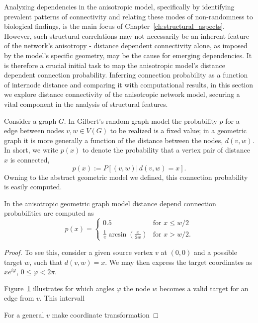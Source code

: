 Analyzing dependencies in the anisotropic model, specifically by
identifying prevalent patterns of connectivity and relating these
modes of non-randomness to biological findings, is the main focus of
Chapter~\ref{ch:structural_aspects}. However, such structural
correlations may not necessarily be an inherent feature of the
network's anisotropy - distance dependent connectivity alone, as
imposed by the model's specific geometry, may be the cause for
emerging dependencies. It is therefore a crucial initial task to map
the anisotropic model's distance dependent connection
probability. Inferring connection probability as a function of
internode distance and comparing it with computational results, in
this section we explore distance connectivity of the anisotropic
network model, securing a vital component in the analysis of
structural features.

Consider a graph $G$. In Gilbert's random graph model the probability
$p$ for a edge between nodes $v,w \in V(G)$ to be realized is a fixed
value; in a geometric graph it is more generally a function of the
distance between the nodes, $d(v,w)$. In short, we write $p(x)$ to
denote the probability that a vertex pair of distance $x$ is
connected,
\[
  p(x) := P\left[(v,w)|\,d(v,w)=x\right].
\]
Owning to the abstract geometric model we defined, this connection
probability is easily computed.

\begin{proposition} \label{distance_prof}
In the anisotropic geometric graph model distance depend connection
probabilities are computed as 
\[
p(x) = \begin{cases} 0.5 & \mathrm{for} \,\, x\le w/2 \\
                       \frac{1}{\pi}
                       \operatorname{arcsin}(\frac{x}{2w}) &
                       \mathrm{for} \,\, x >
                       w/2. \end{cases}
\]
\end{proposition} 

\begin{proof}
  To see this, consider a given source vertex $v$ at $(0,0)$ and a
  possible target $w$, such that $d(v,w) = x$. We may then express the
  target coordinates as $x e^{i\varphi}$, $0 \le \varphi < 2\pi$.

  Figure~\ref{fig:geomtr_prb} illustrates for which angles
  $\varphi$ the node $w$ becomes a valid target for an edge from
  $v$. This intervall

  \begin{figure}[h] 
    \centering 
    \label{fig:geomtr_prb}
  \end{figure}

  For a general $v$ make coordinate transformation

\end{proof}

